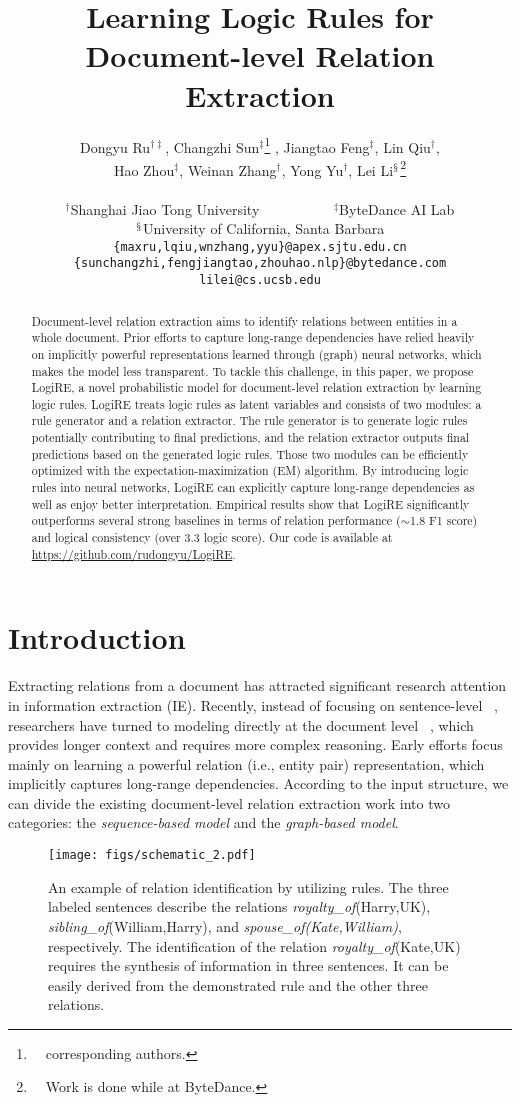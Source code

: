 \documentclass[11pt]{article}
\title{ Learning Logic Rules for Document-level Relation Extraction}
\author{
\parbox{\linewidth}{
\centering
Dongyu Ru$^{\dagger\ddagger}$, 
Changzhi Sun$^{\ddagger}$\thanks{\ \ corresponding authors.} , Jiangtao Feng$^\ddagger$, 
Lin Qiu$^\dagger$,\\ 
Hao Zhou$^\ddagger$,
Weinan Zhang$^{\dagger}$\footnotemark[1] , 
Yong Yu$^\dagger$, 
Lei Li$^\mathsection$\thanks{\ \ Work is done while at ByteDance.}
}\\
$^\dagger$Shanghai Jiao Tong University ~~~~~~~~~~$^\ddagger$ByteDance AI Lab \\
$^\mathsection$University of California, Santa Barbara\\
{\texttt{\{maxru,lqiu,wnzhang,yyu\}@apex.sjtu.edu.cn}} \\
{\texttt{\{sunchangzhi,fengjiangtao,zhouhao.nlp\}@bytedance.com}}\\
{\texttt{lilei@cs.ucsb.edu}}
}
\newcommand{\mymodel}{LogiRE\xspace}
\begin{document}
\maketitle
\begin{abstract}
Document-level relation extraction aims to identify relations between entities in a whole document. 
Prior efforts to capture long-range dependencies have relied heavily on implicitly powerful representations learned through (graph) neural networks,
which makes the model less transparent.
To tackle this challenge,
in this paper, we propose \mymodel, a novel probabilistic model for document-level relation extraction by learning logic rules.
\mymodel treats logic rules as latent variables
and consists of two modules: a rule generator and a relation extractor.
The rule generator is to generate logic rules potentially contributing to final predictions, 
and the relation extractor outputs final predictions based on the generated logic rules.
Those two modules can be efficiently optimized with the expectation-maximization (EM) algorithm.
By introducing logic rules into neural networks, 
\mymodel can explicitly capture long-range dependencies as well as enjoy better interpretation.
Empirical results show that \mymodel significantly outperforms several strong baselines in terms of relation performance ($\sim$1.8 F1 score) and logical consistency (over 3.3 logic score).
Our code is available at \url{https://github.com/rudongyu/LogiRE}. \end{abstract}

\section{Introduction}
\label{sec:intro}
Extracting relations from a document has attracted significant research attention in information extraction (IE).
Recently, instead of focusing on sentence-level ~\cite{socher-etal-2012-semantic, dos-santos-etal-2015-classifying, han-etal-2018-hierarchical, zhang-etal-2018-graph, wang-etal-2021-enpar, wang-etal-2021-unire},
researchers have turned to modeling directly at the document level ~\cite{wang2019fine, ye-etal-2020-coreferential, zhou2021atlop},
which provides longer context and requires more complex reasoning.
Early efforts focus mainly on learning a powerful relation (i.e., entity pair) representation, which implicitly captures long-range dependencies.
According to the input structure, we can divide the existing document-level relation extraction work into two categories: the \emph{sequence-based model}  and the \emph{graph-based model}.
\begin{figure}
    \centering
    \texttt{[image: figs/schematic\_2.pdf]}
    \caption{An example of relation identification by utilizing rules. The three labeled sentences describe the relations \textit{royalty\_of}(Harry,UK), \textit{sibling\_of}(William,Harry), and \textit{spouse\_of(Kate,William)}, respectively. The identification of the relation \textit{royalty\_of}(Kate,UK) requires the synthesis of information in three sentences. It can be easily derived from the demonstrated rule and the other three relations.}
    \label{fig:schematic}
    \vspace{-10pt}
\end{figure}
\end{document}

